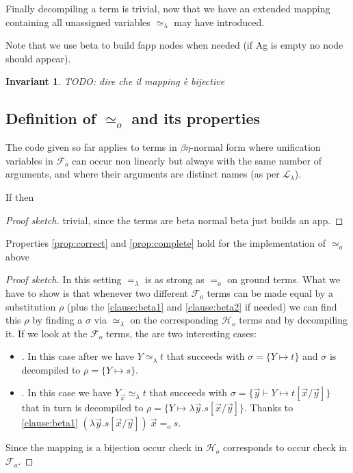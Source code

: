 \documentclass[sigconf,natbib=false,review]{acmart}
\newtheorem{invariant}{Invariant}
\newcommand{\EqualRel}{\ensuremath{=}}
\newcommand{\UnifRel}{\ensuremath{\simeq}}
\newcommand{\Uo}{\ensuremath{\UnifRel_o}\xspace}
\newcommand{\Eo}{\ensuremath{\EqualRel_o}\xspace}
\newcommand{\Ue}{\ensuremath{\UnifRel_\lambda}\xspace}
\newcommand{\Ee}{\ensuremath{\EqualRel_\lambda}\xspace}
\newcommand{\llambda}{\ensuremath{\mathcal{L}_\lambda}\xspace}
\newcommand{\Fo}{\ensuremath{\mathcal{F}_{\!o}\xspace}} %
\newcommand{\Ho}{\ensuremath{\mathcal{H}_o}\xspace}
\begin{document}


\noindent
Finally decompiling a term is trivial, now that we have an extended
mapping containing all unassigned variables \Ue may have introduced.



\noindent
Note that we use beta to build fapp nodes when needed (if Ag is empty
no  node should appear).


\begin{invariant}

  TODO: dire che il mapping è bijective
  \label{inv:map-bijective}
\end{invariant}

\subsection{Definition of \Uo and its properties}



The code given so far applies to terms in $\beta\eta$-normal form where
unification variables in \Fo{} can occur non linearly but always with
the same number of arguments, and where their arguments are distinct names
(as per \llambda).

\begin{lemma} If
   then 
\end{lemma}
\begin{proof}[Proof sketch]
trivial, since the terms are beta normal beta just builds an app.
\end{proof}


\begin{lemma}
Properties \ref{prop:correct} and
\ref{prop:complete} hold for the implementation of \Uo above
\end{lemma}
\begin{proof}[Proof sketch]
 In this setting \Ee is as strong as
\Eo on ground terms. What we have to show is that whenever two different \Fo
terms can be made equal by a substitution $\rho$ (plus the \ref{clause:beta1}
and \ref{clause:beta2} if needed) we can find this $\rho$ by finding
a $\sigma$ via \Ue{} on the corresponding \Ho terms and by decompiling it.
If we look at the \Fo{} terms, the are two interesting cases:
\begin{itemize}
\item \elpiIn{fuva X ~\Uo~s}. In this case after  we have
  $Y \Ue t$ that succeeds with $\sigma = \{ Y \mapsto t\}$ and
  $\sigma$ is decompiled to $\rho = \{ Y \mapsto s\}$.
\item \elpiIn{fapp[fuva X|L] ~\Uo~s}. In this case
 we have $Y_{\vec{x}} \Ue t$ that succeeds with
 $\sigma = \{ \vec{y} \vdash Y \mapsto t[\vec{x}/\vec{y}]\}$ that in turn
 is decompiled to $\rho = \{ Y \mapsto \lambda \vec{y}.s[\vec{x}/\vec{y}]\}$.
 Thanks to \ref{clause:beta1}
 $(\lambda \vec{y}.s[\vec{x}/\vec{y}])~\vec{x} \Eo s$.
\end{itemize}
Since the mapping is a bijection occur check in \Ho{} corresponds to occur
check in \Fo{}.
\end{proof}
\end{document}
